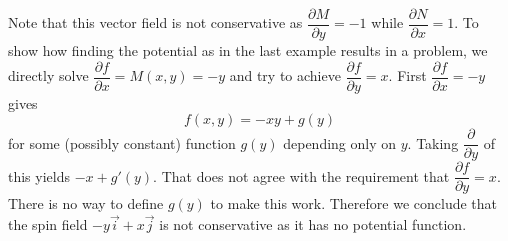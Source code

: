 {Note that this vector field is not conservative as $\dfrac{\partial M}{\partial y} = -1$ while $\dfrac{\partial N}{\partial x} = 1$.  To show how finding the potential as in the last example results in a problem, we directly solve $\dfrac{\partial f}{\partial x} = M(x,y) = -y$ and try to achieve $\dfrac{\partial f}{\partial y} = x$. First $\dfrac{\partial f}{\partial x} = -y$ gives 
$$f(x,y) = -xy + g(y)$$
for some (possibly constant) function $g(y)$ depending only on $y$. Taking $\dfrac{\partial}{\partial y}$ of this yields $-x + g'(y)$. That does not agree with the requirement that
$\dfrac{\partial f}{\partial y} = x$. There is no way to define $g(y)$ to make this work.  Therefore we conclude that the spin field $-y\vec i + x\vec j$ is not conservative as it has no potential function.}



